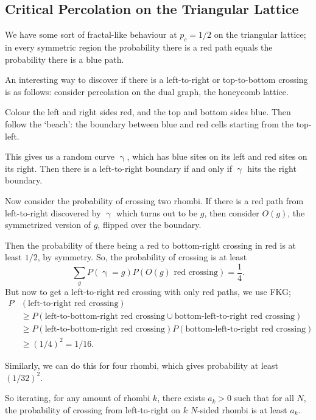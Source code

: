 \documentclass[12pt]{article}
\begin{document}

\subsection{Critical Percolation on the Triangular Lattice}%
\label{sub:cptl}

We have some sort of fractal-like behaviour at $p_c = 1/2$ on the triangular lattice; in every symmetric region the probability there is a red path equals the probability there is a blue path.

An interesting way to discover if there is a left-to-right or top-to-bottom crossing is as follows: consider percolation on the dual graph, the honeycomb lattice.

Colour the left and right sides red, and the top and bottom sides blue. Then follow the `beach': the boundary between blue and red cells starting from the top-left.

This gives us a random curve $\upgamma$, which has blue sites on its left and red sites on its right. Then there is a left-to-right boundary if and only if $\upgamma$ hits the right boundary.

Now consider the probability of crossing two rhombi. If there is a red path from left-to-right discovered by $\upgamma$ which turns out to be $g$, then consider $O(g)$, the symmetrized version of $g$, flipped over the boundary.

Then the probability of there being a red to bottom-right crossing in red is at least $1/2$, by symmetry. So, the probability of crossing is at least
\[
	\sum_g P(\upgamma = g) P(O(g) \text{ red crossing}) = \frac{1}{4}.
\]
But now to get a left-to-right red crossing with only red paths, we use FKG;
\begin{align*}
	P&(\text{left-to-right red crossing}) \\
	&\geq P(\text{left-to-bottom-right red crossing} \cup \text{bottom-left-to-right red crossing}) \\
					     &\geq P(\text{left-to-bottom-right red crossing}) P(\text{bottom-left-to-right red crossing}) \\
					     &\geq (1/4)^2 = 1/16.
\end{align*}

Similarly, we can do this for four rhombi, which gives probability at least $(1/32)^2$.

So iterating, for any amount of rhombi $k$, there exists $a_k > 0$ such that for all $N$, the probability of crossing from left-to-right on $k$ $N$-sided rhombi is at least $a_k$.
\end{document}
